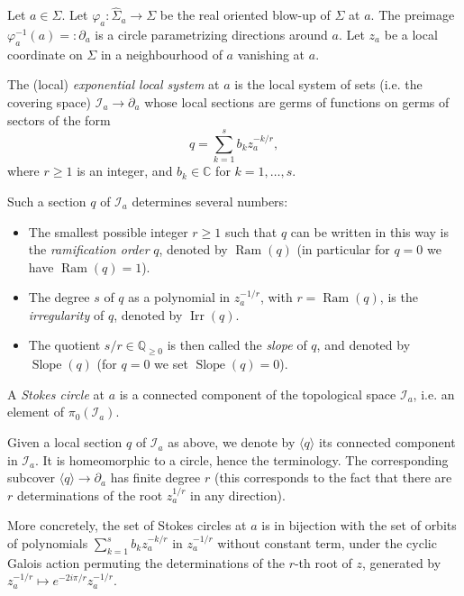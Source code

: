 \documentclass[11pt,a4paper]{amsart}
\numberwithin{equation}{section}
\DeclareMathOperator{\Ram}{Ram}
\DeclareMathOperator{\Irr}{Irr}
\DeclareMathOperator{\Slope}{Slope}
\newcommand{\cir}[1]{\langle #1 \rangle}
\begin{document}
Let $a\in \Sigma$. Let $\varphi_a:\widehat \Sigma_a\to \Sigma$ be the real oriented blow-up of $\Sigma$ at $a$. The preimage $\varphi_a^{-1}(a)=:\partial_a$ is a circle parametrizing directions around $a$. Let $z_a$ be a local coordinate on $\Sigma$ in a neighbourhood of $a$ vanishing at $a$. 

\begin{definition}
The (local) \emph{exponential local system} at $a$ is the local system of sets (i.e. the covering space) $\mathcal I_a\to \partial_a$ whose local sections are germs of functions on germs of sectors of the form
\begin{equation}
\label{eq:exponential_factor}
q=\sum_{k=1}^s b_k z_a^{-k/r},
\end{equation}
where $r\geq 1$ is an integer, and $b_k\in \mathbb C$ for $k=1, \dots, s$. 
\end{definition}

Such a section $q$ of $\mathcal I_a$ determines several numbers:
\begin{itemize}
\item 
The smallest possible integer $r\geq 1$ such that $q$ can be written in this way is the \emph{ramification order} $q$, denoted by $\Ram(q)$ (in particular for $q=0$ we have $\Ram(q)=1$). 
\item  The degree $s$ of $q$ as a polynomial in $z_a^{-1/r}$, with $r=\Ram(q)$, is the \emph{irregularity} of $q$, denoted by $\Irr(q)$.
\item The quotient $s/r\in \mathbb Q_{\geq 0}$ is then called the \emph{slope} of $q$, and denoted by $\Slope(q)$ (for $q=0$ we set $\Slope(q)=0$).
\end{itemize}


\begin{definition} A \emph{Stokes circle} at $a$ is a connected component of the topological space $\mathcal I_a$, i.e. an element of $\pi_0(\mathcal I_a)$.
\end{definition}

Given a local section $q$ of $\mathcal I_a$ as above, we denote by $\cir{q}$ its connected component in $\mathcal I_a$. It is homeomorphic to a circle, hence the terminology. The corresponding subcover $\cir{q}\to\partial_a$ has finite degree $r$ (this corresponds to the fact that there are $r$ determinations of the root $z_a^{1/r}$ in any direction). 

More concretely, the set of Stokes circles at $a$ is in bijection with the set of orbits of polynomials $\sum_{k=1}^s b_k z_a^{-k/r}$ in $z_a^{-1/r}$ without constant term, under the cyclic Galois action permuting the determinations of the $r$-th root of $z$, generated by $z_a^{-1/r}\mapsto e^{-2i\pi/r}z_a^{-1/r}$.
\end{document}
